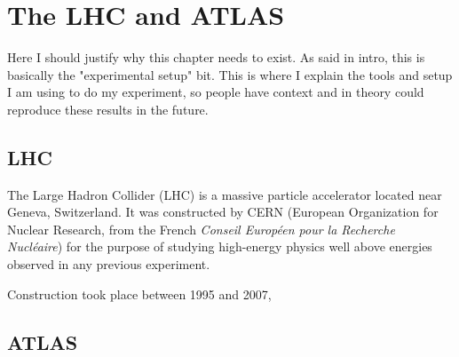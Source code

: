\chapter{The LHC and ATLAS}\label{chapter:experiment}

Here I should justify why this chapter needs to exist. As said in intro, this is basically the "experimental setup" bit. This is where I explain the tools and setup I am using to do my experiment, so people have context and in theory could reproduce these results in the future.





\section{LHC}

The Large Hadron Collider (LHC) is a massive particle accelerator located near Geneva, Switzerland.
It was constructed by CERN (European Organization for Nuclear Research, from the French \textit{Conseil Européen pour la Recherche Nucléaire}) for the purpose of studying high-energy physics well above energies observed in any previous experiment.

Construction took place between 1995 and 2007, 





\section{ATLAS}

